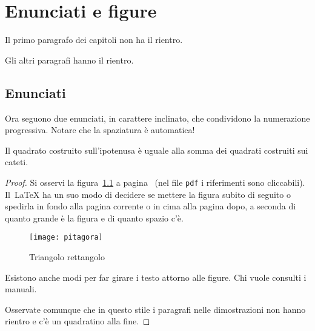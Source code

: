
\chapter{Enunciati e figure}
  
Il primo paragrafo dei capitoli non ha il rientro.

Gli altri paragrafi hanno il rientro.

\section{Enunciati}

Ora seguono due enunciati, in carattere inclinato, che condividono la numerazione progressiva. Notare che la spaziatura \`e automatica!

\begin{teorema}
Il quadrato costruito sull'ipotenusa \`e uguale alla somma dei quadrati costruiti sui cateti.
\end{teorema}

\begin{proof}
Si osservi la figura~\ref{figura:pitagora} a pagina~\pageref{figura:pitagora} (nel file \texttt{pdf} i riferimenti sono cliccabili). Il~\LaTeX{} ha un suo modo di decidere se mettere la figura subito di seguito o spedirla in fondo alla pagina corrente o in cima alla pagina dopo, a seconda di quanto grande \`e la figura e di quanto spazio c'\`e.

\begin{figure}
\begin{center}
\texttt{[image: pitagora]}
\caption[teor. di Pitagora]{Triangolo rettangolo}
\label{figura:pitagora}
\end{center}
\end{figure}

Esistono anche modi per far girare i testo attorno alle
figure. Chi vuole consulti i manuali.

Osservate comunque che in questo stile i paragrafi nelle dimostrazioni non hanno rientro e c'\`{e} un quadratino alla fine.
\end{proof}


